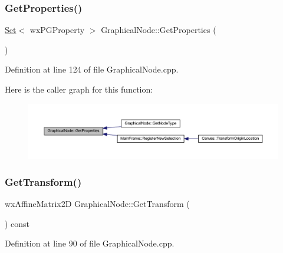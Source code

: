\subsubsection{\texorpdfstring{Get\+Properties()}{GetProperties()}}
{\footnotesize\ttfamily \hyperlink{class_set}{Set}$<$ wx\+P\+G\+Property $>$ Graphical\+Node\+::\+Get\+Properties (\begin{DoxyParamCaption}{ }\end{DoxyParamCaption})}



Definition at line 124 of file Graphical\+Node.\+cpp.

Here is the caller graph for this function\+:
\nopagebreak
\begin{figure}[H]
\begin{center}
\leavevmode
\includegraphics[width=350pt]{class_graphical_node_a9d89885db9553820d3557a801a83b9de_icgraph}
\end{center}
\end{figure}
\mbox{\label{class_graphical_node_a3556bb1d323f16fd394211cf82239f01}} 
\subsubsection{\texorpdfstring{Get\+Transform()}{GetTransform()}}
{\footnotesize\ttfamily wx\+Affine\+Matrix2D Graphical\+Node\+::\+Get\+Transform (\begin{DoxyParamCaption}{ }\end{DoxyParamCaption}) const}



Definition at line 90 of file Graphical\+Node.\+cpp.

